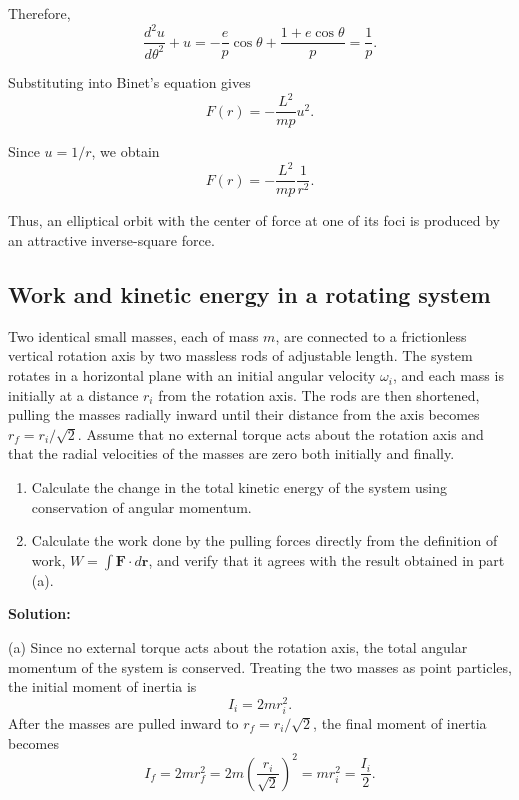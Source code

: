 \documentclass[12pt]{article}
\begin{document}
Therefore,
\begin{equation}
    \frac{d^2u}{d\theta^2}+u
    =-\frac{e}{p}\cos\theta
    +\frac{1+e\cos\theta}{p}
    =\frac{1}{p}.
\end{equation}

Substituting into Binet's equation gives
\begin{equation}
    F(r)=-\frac{L^2}{mp}u^2.
\end{equation}

Since $u=1/r$, we obtain
\begin{equation}
    \boxed{F(r)=-\frac{L^2}{mp}\frac{1}{r^2}}.
\end{equation}

Thus, an elliptical orbit with the center of force at one
of its foci is produced by an attractive inverse-square force.









\subsection{Work and kinetic energy in a rotating system}

Two identical small masses, each of mass $m$, are connected to a frictionless vertical rotation axis by two massless rods of adjustable length. The system rotates in a horizontal plane with an initial angular velocity $\omega_i$, and each mass is initially at a distance $r_i$ from the rotation axis. The rods are then shortened, pulling the masses radially inward until their distance from the axis becomes $r_f=r_i/\sqrt{2}$. Assume that no external torque acts about the rotation axis and that the radial velocities of the masses are zero both initially and finally.

\begin{enumerate}
    \item[(a)] Calculate the change in the total kinetic energy of the system using conservation of angular momentum.
    \item[(b)] Calculate the work done by the pulling forces directly from the definition of work, $W=\int\mathbf{F}\cdot d\mathbf{r}$, and verify that it agrees with the result obtained in part (a).
\end{enumerate}

\textbf{Solution:}

(a) Since no external torque acts about the rotation axis, the total angular momentum of the system is conserved. Treating the two masses as point particles, the initial moment of inertia is
\begin{equation}
    I_i=2mr_i^2.
\end{equation}
After the masses are pulled inward to $r_f=r_i/\sqrt{2}$, the final moment of inertia becomes
\begin{equation}
    I_f=2mr_f^2
    =2m\left(\frac{r_i}{\sqrt{2}}\right)^2
    =mr_i^2
    =\frac{I_i}{2}.
\end{equation}
\end{document}
